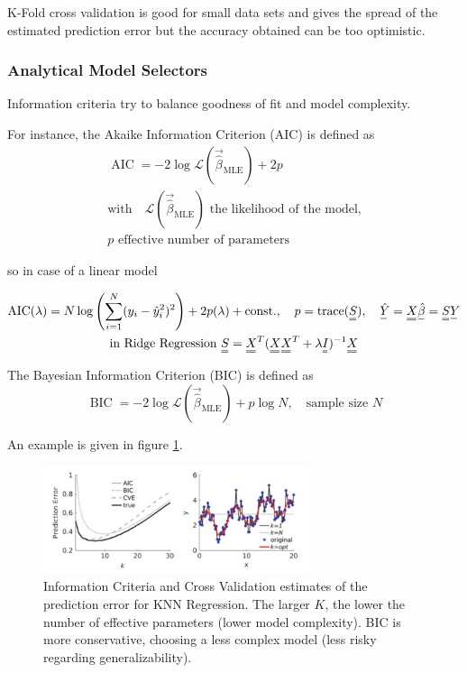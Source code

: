 K-Fold cross validation is \textcolor{green1}{good for small data sets} and \textcolor{green1}{gives the spread of the estimated 
prediction error} but the \textcolor{red1}{accuracy obtained can be too optimistic}.

\subsubsection{Analytical Model Selectors}
Information criteria try to balance goodness of fit and model complexity.

For instance, the \textcolor{blue1}{Akaike Information Criterion (AIC)} is defined as
\begin{equation}
    \begin{gathered}
        \operatorname{AIC} = -2 \log \mathcal{L}(\vec{\hat{\beta}}_\text{MLE}) + 2p \\
        \text{with} \quad \mathcal{L}(\vec{\hat{\beta}}_\text{MLE}) \text{ the likelihood of the model,} \\
        p \text{ effective number of parameters}
    \end{gathered}
\end{equation}

so in case of a linear model

\begin{equation}
    \begin{gathered}
        \operatorname{AIC}(\lambda) = N \log \left( \sum_{i=1}^N (y_i - \hat{y}_i^2)^2 \right) + 2p(\lambda) + \text{const.}, \quad p = \text{trace}(\mat{S}), \quad \vec{\hat{Y}} = \mat{X} \vec{\hat{\beta}} = \mat{S} \vec{Y} \\
        \text{in Ridge Regression } \mat{S} = \mat{X}^T (\mat{X} \mat{X}^T + \lambda \mat{I})^{-1} \mat{X}
    \end{gathered}
\end{equation}

The \textcolor{blue1}{Bayesian Information Criterion (BIC)} is defined as
\begin{equation}
    \operatorname{BIC} = -2 \log \mathcal{L}(\vec{\hat{\beta}}_\text{MLE}) + p \log N, \quad \text{sample size } N
\end{equation}

An example is given in figure \ref{fig:inf_knn_reg}.

\begin{figure}[!htb]
    \centering
    \includegraphics[width=0.7\textwidth]{figures/knn_reg.png}
    \caption{Information Criteria and Cross Validation estimates of the prediction error for KNN Regression.
    The larger $K$, the lower the number of effective parameters (lower model complexity). BIC is more conservative,
    choosing a less complex model (less risky regarding generalizability).}
    \label{fig:inf_knn_reg}
\end{figure}

